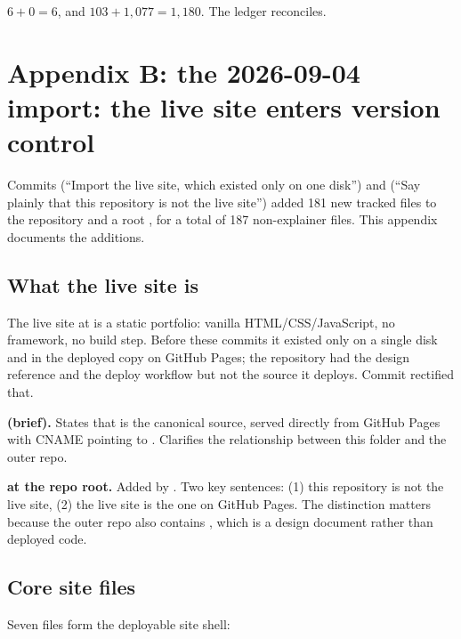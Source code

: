 \documentclass[11pt,a4paper]{article}
\begin{document}
$6 + 0 = 6$, and $103 + 1{,}077 = 1{,}180$. The ledger reconciles.


\section{Appendix B: the 2026-09-04 import: the live site enters version control}

Commits  (``Import the live site, which existed only on one
disk'') and  (``Say plainly that this repository is not the live
site'') added 181 new tracked files to the repository and a root
, for a total of 187 non-explainer files. This appendix
documents the additions.

\subsection*{What the live site is}

The live site at  is a static portfolio: vanilla
HTML/CSS/JavaScript, no framework, no build step. Before these commits it
existed only on a single disk and in the deployed copy on GitHub Pages; the
repository had the design reference and the deploy workflow but not the source
it deploys. Commit  rectified that.

\textbf{ (brief).} States that  is
the canonical source, served directly from GitHub Pages with CNAME pointing to
. Clarifies the relationship between this folder and the
outer repo.

\textbf{ at the repo root.} Added by . Two key
sentences: (1) this repository is not the live site, (2) the live site is the
one on GitHub Pages. The distinction matters because the outer repo also
contains , which is a design document rather than
deployed code.

\subsection*{Core site files}

Seven files form the deployable site shell:
\end{document}
